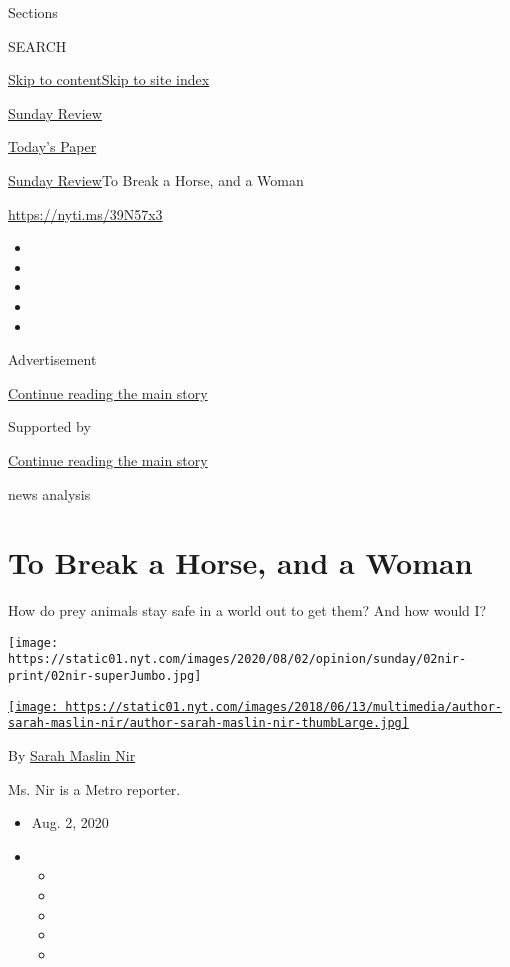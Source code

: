 Sections

SEARCH

\protect\hyperlink{site-content}{Skip to
content}\protect\hyperlink{site-index}{Skip to site index}

\href{https://www.nytimes.com/section/opinion/sunday}{Sunday Review}

\href{https://myaccount.nytimes.com/auth/login?response_type=cookie\&client_id=vi}{}

\href{https://www.nytimes.com/section/todayspaper}{Today's Paper}

\href{/section/opinion/sunday}{Sunday Review}\textbar{}To Break a Horse,
and a Woman

\url{https://nyti.ms/39N57x3}

\begin{itemize}
\item
\item
\item
\item
\item
\end{itemize}

Advertisement

\protect\hyperlink{after-top}{Continue reading the main story}

Supported by

\protect\hyperlink{after-sponsor}{Continue reading the main story}

news analysis

\hypertarget{to-break-a-horse-and-a-woman}{%
\section{To Break a Horse, and a
Woman}\label{to-break-a-horse-and-a-woman}}

How do prey animals stay safe in a world out to get them? And how would
I?

\texttt{[image: https://static01.nyt.com/images/2020/08/02/opinion/sunday/02nir-print/02nir-superJumbo.jpg]}

\href{https://www.nytimes.com/by/sarah-maslin-nir}{\texttt{[image: https://static01.nyt.com/images/2018/06/13/multimedia/author-sarah-maslin-nir/author-sarah-maslin-nir-thumbLarge.jpg]}}

By \href{https://www.nytimes.com/by/sarah-maslin-nir}{Sarah Maslin Nir}

Ms. Nir is a Metro reporter.

\begin{itemize}
\item
  Aug. 2, 2020
\item
  \begin{itemize}
  \item
  \item
  \item
  \item
  \item
  \end{itemize}
\end{itemize}

